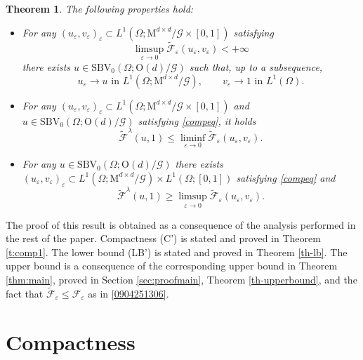 \documentclass[a4paper,reqno]{amsart}
\newtheorem{theorem}[definition]{Theorem}
\theoremstyle{remark}
\def\e{\varepsilon}
\newcommand{\F}{\mathcal{F}}
\newcommand{\G}{\mathcal{G}}
\newcommand{\tF}{\widetilde{\F}}
\newcommand{\On}{\mathrm{O}(d)}
\newcommand{\Mno}{\mathrm{M}^{d\times d}}
\newcommand{\PC}{\mathrm{SBV}_0}
\numberwithin{equation}{section}
\begin{document}
\begin{theorem}\label{thm:maineq}
	The following properties hold:
	\begin{itemize}
		\item[(C)'] For any $(u_\varepsilon, v_\varepsilon)_\varepsilon \subset L^1(\Omega;\Mno/\G \times [0,1])$ satisfying
		\begin{equation}\label{compesteq}
			\limsup_{\varepsilon\to 0} \tF_\varepsilon(u_\varepsilon, v_\varepsilon)<+\infty
		\end{equation}
		there exists $u \in \PC(\Omega; \On/\G)$ such that, up to a subsequence,
		\begin{equation}\label{compeq}
			u_\varepsilon \to u \text{ in }L^1(\Omega; \Mno/\G),\qquad v_\varepsilon \to 1 \text{ in }L^1(\Omega).
		\end{equation}
\item[(LB)'] For any $(u_\varepsilon, v_\varepsilon)_\varepsilon
\subset L^1(\Omega;\Mno/\G\times [0,1])$ and $u \in \PC(\Omega; \On/\G)$ satisfying \eqref{compeq}, it holds
		\begin{equation*}\label{liminfeq}
			\tF^\lambda(u,1)\leq \liminf_{\varepsilon \to 0} \tF_\varepsilon(u_\varepsilon, v_\varepsilon).
		\end{equation*}
\item[(UB)'] For any $u \in \PC(\Omega; \On/\G)$ there exists $(u_\varepsilon, v_\varepsilon)_\varepsilon \subset L^1(\Omega;\Mno/\G) \times L^1(\Omega;[0,1])$ satisfying \eqref{compeq} and
		\begin{equation}\label{limsupeq}
			\tF^\lambda(u,1)\geq \limsup_{\varepsilon \to 0} \tF_\varepsilon(u_\varepsilon, v_\varepsilon).
		\end{equation}
	\end{itemize}
\end{theorem}

The proof of this result is obtained as a consequence of the analysis performed in the rest of the paper. Compactness (C') is stated and proved in Theorem \ref{t:comp1}. The lower bound (LB') is stated and proved in Theorem \ref{th-lb}. The upper bound is a consequence of the corresponding upper bound in Theorem \ref{thm:main}, proved in Section \ref{sec:proofmain}, Theorem \ref{th-upperbound}, and the fact that $\tF_\e\leq \F_\e$ as in \eqref{0904251306}.

\section{Compactness}\label{subsec:comp}
\end{document}
